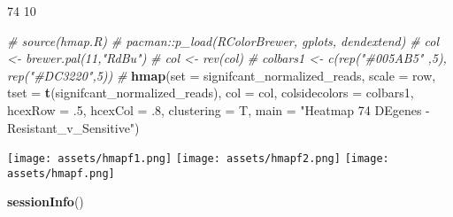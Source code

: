 \documentclass[
]{article}
\newenvironment{Shaded}{\begin{snugshade}}{\end{snugshade}}
\newcommand{\AttributeTok}[1]{\textcolor[rgb]{0.13,0.29,0.53}{#1}}
\newcommand{\CommentTok}[1]{\textcolor[rgb]{0.56,0.35,0.01}{\textit{#1}}}
\newcommand{\DecValTok}[1]{\textcolor[rgb]{0.00,0.00,0.81}{#1}}
\newcommand{\FunctionTok}[1]{\textcolor[rgb]{0.13,0.29,0.53}{\textbf{#1}}}
\newcommand{\NormalTok}[1]{#1}
\newcommand{\StringTok}[1]{\textcolor[rgb]{0.31,0.60,0.02}{#1}}
\begin{document}
\begin{Shaded}
\begin{Highlighting}[]
\NormalTok{[1] 74 10}
\end{Highlighting}
\end{Shaded}

\begin{Shaded}
\begin{Highlighting}[]
\CommentTok{\# source(\textquotesingle{}hmap.R\textquotesingle{})}
\CommentTok{\# pacman::p\_load(RColorBrewer, gplots, dendextend)}
\CommentTok{\# col \textless{}{-} brewer.pal(11,"RdBu")}
\CommentTok{\# col \textless{}{-} rev(col)}
\CommentTok{\# colbars1 \textless{}{-} c(rep("\#005AB5" ,5), rep("\#DC3220",5))}
\CommentTok{\#}
\FunctionTok{hmap}\NormalTok{(}\AttributeTok{set =}\NormalTok{ signifcant\_normalized\_reads,}
     \AttributeTok{scale =} \StringTok{\textquotesingle{}row\textquotesingle{}}\NormalTok{,}
     \AttributeTok{tset =} \FunctionTok{t}\NormalTok{(signifcant\_normalized\_reads),}
     \AttributeTok{col =}\NormalTok{ col,}
     \AttributeTok{colsidecolors =}\NormalTok{ colbars1,}
     \AttributeTok{hcexRow =}\NormalTok{ .}\DecValTok{5}\NormalTok{,}
     \AttributeTok{hcexCol =}\NormalTok{ .}\DecValTok{8}\NormalTok{,}
     \AttributeTok{clustering =}\NormalTok{ T,}
     \AttributeTok{main =} \StringTok{"Heatmap 74 DEgenes {-} Resistant\_v\_Sensitive"}\NormalTok{)}
\end{Highlighting}
\end{Shaded}

\texttt{[image: assets/hmapf1.png]}
\texttt{[image: assets/hmapf2.png]}
\texttt{[image: assets/hmapf.png]}

\begin{Shaded}
\begin{Highlighting}[]
\FunctionTok{sessionInfo}\NormalTok{()}
\end{Highlighting}
\end{Shaded}
\end{document}
